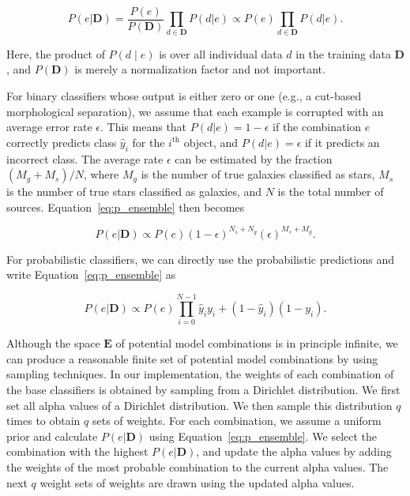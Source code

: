 \documentclass[useAMS,usenatbib]{mn2e}
\newcommand{\eg}{{e.g., }}
\begin{document}
\begin{equation}
  P \left(e | \mathbf{D} \right)
  = \frac{P \left(e \right)}{P \left(\mathbf{D} \right)}
  \prod_{d \in \mathbf{D}} P \left( d | e \right)
  \propto P \left(e\right) \prod_{d \in \mathbf{D}} P \left(d | e \right).
  \label{eq:p_ensemble}
\end{equation}

\noindent
Here, the product of $P\left(d \mid e\right)$ is
over all individual data $d$ in the training data $\mathbf{D}$,
and $P\left(\mathbf{D}\right)$ is merely a normalization factor
and not important.

For binary classifiers whose output is either zero or one
(\eg a cut-based morphological separation),
we assume that each example is corrupted with
an average error rate $\epsilon$.
This means that
$P\left(d|e\right) = 1-\epsilon$ if the combination $e$
correctly predicts class $\hat{y}_i$ for the $i^{\text{th}}$ object,
and $P\left(d|e\right) = \epsilon$ if it predicts an incorrect class.
The average rate $\epsilon$ can be estimated by
the fraction $\left(M_g + M_s\right) / N$,
where $M_g$ is the number of true galaxies classified as stars,
$M_s$ is the number of true stars classified as galaxies,
and $N$ is the total number of sources.
Equation~\ref{eq:p_ensemble} then becomes

\begin{equation}
  P \left( e | \mathbf{D} \right) \propto 
  P \left( e \right) \left(1 - \epsilon \right)^{N_s + N_g}
  \left( \epsilon \right)^{M_s + M_g}.
\end{equation}

\noindent
For probabilistic classifiers,
we can directly use the probabilistic predictions
and write Equation~\ref{eq:p_ensemble} as

\begin{equation}
  P \left( e | \mathbf{D} \right) \propto 
  P \left( e \right) \prod_{i=0}^{N-1}
  \hat{y}_i y_i + 
  \left(1 - \hat{y}_i\right) \left(1 - y_i\right).
\end{equation}


Although the space $\mathbf{E}$ of potential model combinations
is in principle infinite,
we can produce a reasonable finite set
of potential model combinations by using sampling techniques.
In our implementation,
the weights of each combination of the base classifiers
is obtained by sampling from a Dirichlet distribution.
We first set all alpha values of a Dirichlet distribution.
We then sample this distribution $q$ times
to obtain $q$ sets of weights.
For each combination,
we assume a uniform prior and
calculate $P\left(e|\mathbf{D}\right)$ using Equation~\ref{eq:p_ensemble}.
We select the combination with the highest $P\left(e|\mathbf{D}\right)$,
and update the alpha values by
adding the weights of the most probable combination
to the current alpha values.
The next $q$ weight sets of weights are drawn
using the updated alpha values.
\end{document}
